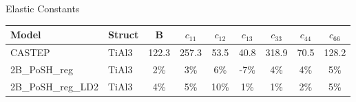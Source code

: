\documentclass[preview]{standalone}
\begin{document}
\begin{center}
\textnormal{Elastic Constants} \\
\vspace{2mm}
\begin{tabular}{ l l c c c c c c c } \toprule 
Model & Struct & B & $c_{11}$ & $c_{12}$ & $c_{13}$ & $c_{33}$ & $c_{44}$ & $c_{66}$\\ \midrule 
CASTEP & TiAl3 & 122.3 & 257.3 & 53.5 & 40.8 & 318.9 & 70.5 & 128.2\\ 
2B\_PoSH\_reg & TiAl3 & 2\% & 3\% & 6\% & -7\% & 4\% & 4\% & 5\%\\ 
2B\_PoSH\_reg\_LD2 & TiAl3 & 4\% & 5\% & 10\% & 1\% & 1\% & 2\% & 5\%\\ 
\end{tabular} \bigskip 
\end{center}
\end{document}
